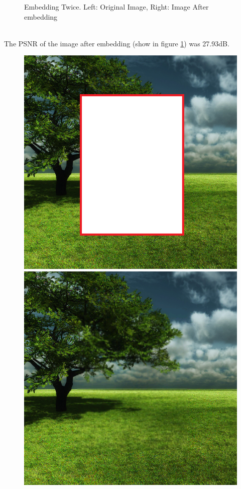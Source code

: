 \documentclass[12pt]{article}
\begin{document}
\begin{figure}[h]
{}%
\caption{Embedding Twice. Left: Original Image, Right: Image After embedding}
\label{fig:treeEmbedTwiceEmbedding}
\end{figure}

\hspace{0pt} \\
The PSNR of the image after embedding (show in figure \ref{fig:treeEmbedTwiceEmbedding}) was 27.93dB.

\begin{figure}[h]
\centerline{%
\includegraphics[scale=0.45]{"Tree Embed twice 0.8 threshold/finalImage - Copy"}%
\hspace{0.1cm}
\includegraphics[scale=0.45]{"Tree Embed twice 0.8 threshold/finalImageAfterRestoration"}%
}
\end{figure}
\end{document}
